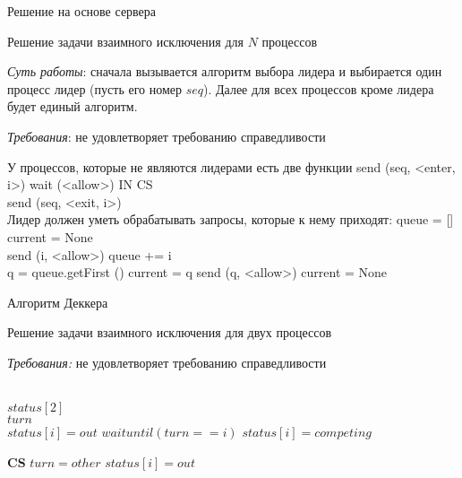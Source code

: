 \begin{algorithm}
\caption{Решение на основе сервера}
\label{algServer}
Решение задачи взаимного исключения для $N$ процессов

\textit{Суть работы}: сначала вызывается алгоритм выбора лидера и выбирается один процесс лидер (пусть его номер $seq$). Далее для всех процессов кроме лидера будет единый алгоритм.

\textit{Требования}: не удовлетворяет требованию справедливости
\begin{algorithmic}
\small
\State У процессов, которые не являются лидерами есть две функции
 
  \State send (seq, <enter, i>)  
  \State wait (<allow>) 
  \State IN CS 
\EndProcedure \\

  \State send (seq, <exit, i>) 
\EndProcedure
\\
\State Лидер должен уметь обрабатывать запросы, которые к нему приходят:
  
  \State queue = []
  \State current = None 
\EndProcedure \\

 
    \State send (i, <allow>) 
  \Else
    \State queue += i
  \EndIf  
\EndProcedure \\

  
    \State q = queue.getFirst ()
    \State current = q
    \State send (q, <allow>)
  \Else
     \State current = None
  \EndIf
\EndProcedure


\end{algorithmic}
\end{algorithm}

\begin{algorithm}
\caption{Алгоритм Деккера}
Решение задачи взаимного исключения для двух процессов

\textit{Требования:} не удовлетворяет требованию справедливости
\label{algDekker}
\begin{algorithmic}
\Ensure  {}
\\$status[2]$ \\ 
$turn$ \\ 
    \State $status[i] = out$
    \State $wait until (turn == i)$
    \State $status[i] = competing$
  \EndIf
\EndWhile

\State \textbf{CS}
\State $turn = other$
\State $status[i] = out$
\end{algorithmic}
\end{algorithm}


